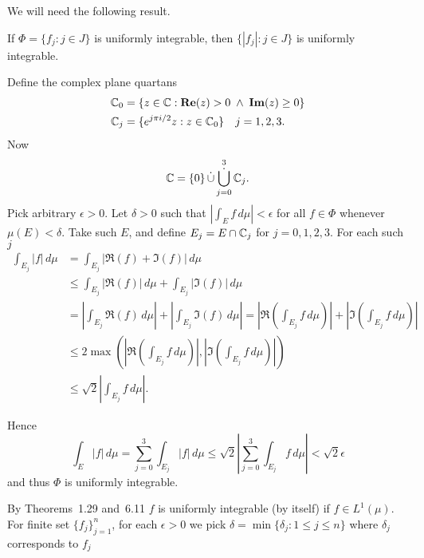 \begin{enumerate}
We will need the following result.
\begin{llem}
If
\(\Phi=\{f_j: j\in J\}\) is uniformly  integrable,
then
\(\{|f_j|: j\in J\}\) is uniformly  integrable.
\end{llem} \label{llem:abs:unifinteg}
\begin{thmproof}
Define the complex plane quartans
\begin{align*}
\mathbb{C}_0 &= \{z\in\mathbb{C}: \mathop{\bf Re}\nolimits(z)>0 \;\wedge\; \mathop{\bf Im}\nolimits(z)\geq 0\} \\
\mathbb{C}_j &= \{e^{j\pi i/2}z: z\in \mathbb{C}_0 \} \quad j=1,2,3.
\end{align*}
Now
\begin{equation*}
\C = \{0\} \disjunion \Disjunion_{j=0}^3 \C_j.
\end{equation*}
Pick arbitrary \(\epsilon> 0\). Let \(\delta>0\) such that 
\(|\int_E f\,d\mu|<\epsilon\) for all \(f\in\Phi\) 
whenever \(\mu(E)<\delta\).
Take such $E$, and define \(E_j = E\cap \mathbb{C}_j\) for \(j=0,1,2,3\).
For each such $j$
\begin{align*}
\int_{E_j} |f|\,d\mu
&= \int_{E_j} |\Re(f) + \Im(f)|\,d\mu \\
&\leq  \int_{E_j} |\Re(f)|\,d\mu + \int_{E_j} |\Im(f)|\,d\mu \\
&=  \left|\int_{E_j} \Re(f)\,d\mu\right| 
  + \left|\int_{E_j} \Im(f)\,d\mu\right| 
 =  \left|\Re\left(\int_{E_j} f\,d\mu\right)\right| 
  + \left|\Im\left(\int_{E_j} f\,d\mu\right)\right| \\
&\leq  2\max\left(\left|\Re\left(\int_{E_j} f\,d\mu\right)\right|,
                  \left|\Im\left(\int_{E_j} f\,d\mu\right)\right|\right) \\
&\leq  \sqrt{2}\left|\int_{E_j} f\,d\mu\right|.
\end{align*}

Hence
\begin{equation*}
\int_E |f|\,d\mu
=    \sum_{j=0}^3 \int_{E_j} |f|\,d\mu
\leq \sqrt{2}\left|\sum_{j=0}^3 \int_{E_j} f\,d\mu\right| 
<    \sqrt{2}\epsilon
\end{equation*}
and thus \(\Phi\) is uniformly integrable.
\end{thmproof}



\begin{itemize}

By Theorems~1.29 and~6.11 \cite{RudinRCA87} $f$ is uniformly integrable
(by itself) if \(f\in L^1(\mu)\).
For finite set \(\{f_j\}_{j=1}^n\), for each \(\epsilon>0\)
we pick \(\delta = \min\{\delta_j: 1\leq j \leq n\}\)
where \(\delta_j\) corresponds to \(f_j\)



\end{itemize}
\end{enumerate}
